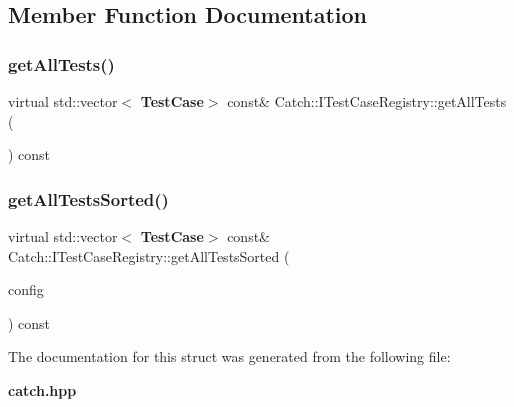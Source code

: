 \subsection{Member Function Documentation}
\mbox{\label{struct_catch_1_1_i_test_case_registry_ad6e4d4a621655123f73ae98cfeda063d}} 
\subsubsection{getAllTests()}
{\footnotesize\ttfamily virtual std\+::vector$<$\textbf{ Test\+Case}$>$ const\& Catch\+::\+I\+Test\+Case\+Registry\+::get\+All\+Tests (\begin{DoxyParamCaption}{ }\end{DoxyParamCaption}) const\hspace{0.3cm}{\ttfamily [pure virtual]}}

\mbox{\label{struct_catch_1_1_i_test_case_registry_a33e46639d0319d35497c05bb5d02be5a}} 
\subsubsection{getAllTestsSorted()}
{\footnotesize\ttfamily virtual std\+::vector$<$\textbf{ Test\+Case}$>$ const\& Catch\+::\+I\+Test\+Case\+Registry\+::get\+All\+Tests\+Sorted (\begin{DoxyParamCaption}\item[{\textbf{ I\+Config} const \&}]{config }\end{DoxyParamCaption}) const\hspace{0.3cm}{\ttfamily [pure virtual]}}



The documentation for this struct was generated from the following file\+:\begin{DoxyCompactItemize}
\item 
\textbf{ catch.\+hpp}\end{DoxyCompactItemize}
